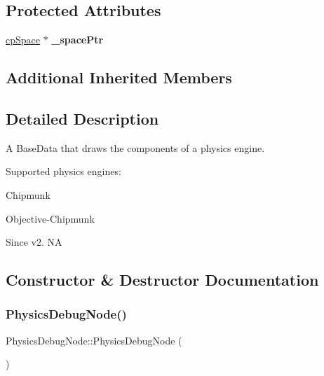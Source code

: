 \subsection*{Protected Attributes}
\begin{DoxyCompactItemize}
\item 
\mbox{\label{classPhysicsDebugNode_a9f28304759b05612de8bcc04db7cb9db}} 
\hyperlink{structcpSpace}{cp\+Space} $\ast$ {\bfseries \+\_\+space\+Ptr}
\end{DoxyCompactItemize}
\subsection*{Additional Inherited Members}


\subsection{Detailed Description}
A Base\+Data that draws the components of a physics engine.

Supported physics engines\+:
\begin{DoxyItemize}
\item Chipmunk
\item Objective-\/\+Chipmunk \begin{DoxySince}{Since}
v2.  NA 
\end{DoxySince}

\end{DoxyItemize}

\subsection{Constructor \& Destructor Documentation}
\mbox{\label{classPhysicsDebugNode_a561828aaa80df4ec84e120ddf1c86220}} 
\subsubsection{\texorpdfstring{Physics\+Debug\+Node()}{PhysicsDebugNode()}\hspace{0.1cm}{\footnotesize\ttfamily [1/2]}}
{\footnotesize\ttfamily Physics\+Debug\+Node\+::\+Physics\+Debug\+Node (\begin{DoxyParamCaption}{ }\end{DoxyParamCaption})}

